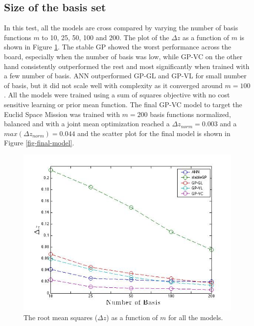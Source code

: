 \documentclass[useAMS,usenatbib,fleqn]{mn2e}
\begin{document}
\subsection{Size of the basis set}
In this test, all the models are cross compared by varying the number of basis functions $m$ to 10, 25, 50, 100 and 200. The plot of the $\Delta z$ as a function of $m$ is shown in Figure \ref{fig-different-basis}. The stable GP showed the worst performance across the board, especially when the number of basis was low, while GP-VC on the other hand consistently outperformed the rest and most significantly when trained with a few number of basis. ANN outperformed GP-GL and GP-VL for small number of basis, but it did not scale well with complexity as it converged around $m=100$. All the models were trained using a sum of squares objective with no cost sensitive learning or prior mean function. The final GP-VC model to target the Euclid Space Mission was trained with $m=200$ basis functions normalized, balanced and with a joint mean optimization reached a $\Delta z_{norm}=0.003$ and a  $max(\Delta z_{norm})=0.044$ and the scatter plot for the final model is shown in Figure \ref{fig-final-model}.

\begin{figure}
       \centering
        \includegraphics[trim = 30px 10px 20px 20px, clip=true,width=1\columnwidth]{figures/different-basis.jpg}
        \caption{The root mean squares ($\Delta z$) as a function of $m$ for all the models. }       
       \label{fig-different-basis}
\end{figure}
\end{document}
